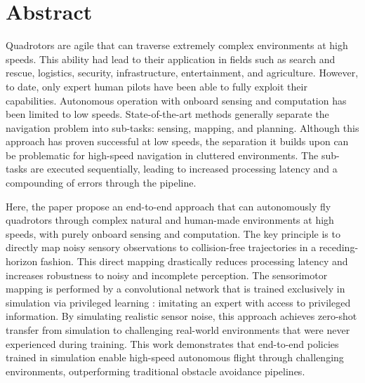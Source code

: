\chapter*{Abstract}
Quadrotors are agile that can traverse extremely complex environments at high speeds. This ability had lead to their application in fields such as search and rescue, logistics, security, infrastructure, entertainment, and agriculture. However, to date, only expert human pilots have been able to fully exploit their capabilities. Autonomous operation with onboard sensing and computation has been limited to low speeds. State-of-the-art methods generally separate the navigation problem into sub-tasks: sensing, mapping, and planning. Although this approach has proven successful at low speeds, the separation it builds upon can be problematic for high-speed navigation in cluttered environments. The sub-tasks are executed sequentially, leading to increased processing latency and a compounding of errors through the pipeline.

Here, the paper \autocite{high-speed-flight} propose an end-to-end approach that can autonomously fly quadrotors through complex natural and human-made environments at high speeds, with purely onboard sensing and computation. The key principle is to directly map noisy sensory observations to collision-free trajectories in a receding-horizon \cite{receding_horizon} fashion. This direct mapping drastically reduces processing latency and increases robustness to noisy and incomplete perception. The sensorimotor mapping is performed by a convolutional network that is trained exclusively in simulation via privileged learning : imitating an expert with access to privileged information. By simulating realistic sensor noise, this approach achieves zero-shot transfer from simulation to challenging real-world environments that were never experienced during training. This work demonstrates that end-to-end policies trained in simulation enable high-speed autonomous flight through challenging environments, outperforming traditional obstacle avoidance pipelines.